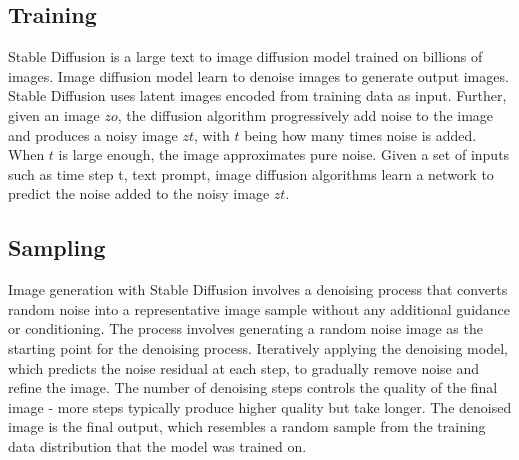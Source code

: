 \documentclass[letterpaper,twocolumn,10pt]{article}
\begin{document}
\subsection{Training}

Stable Diffusion is a large text to image diffusion model trained on billions of images. Image diffusion model learn to denoise images to generate output images. Stable Diffusion uses latent images encoded from training data as input. Further, given an image $zo$, the diffusion algorithm progressively add noise to the image and produces a noisy image $zt$, with $t$ being how many times noise is added. When $t$ is large enough, the image approximates pure noise. Given a set of inputs such as time step t, text prompt, image diffusion algorithms learn a network to predict the noise added to the noisy image $zt$.

\subsection{Sampling}

Image generation with Stable Diffusion involves a denoising process that converts random noise into a representative image sample without any additional guidance or conditioning. The process involves generating a random noise image as the starting point for the denoising process. Iteratively applying the denoising model, which predicts the noise residual at each step, to gradually remove noise and refine the image. The number of denoising steps controls the quality of the final image - more steps typically produce higher quality but take longer.
The denoised image is the final output, which resembles a random sample from the training data distribution that the model was trained on.




\end{document}
